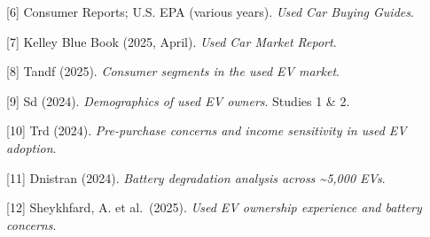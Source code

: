 \documentclass[
  letterpaper,
  DIV=11,
  numbers=noendperiod]{scrartcl}
\begin{document}
{[}6{]} Consumer Reports; U.S. EPA (various years). \emph{Used Car
Buying Guides}.

{[}7{]} Kelley Blue Book (2025, April). \emph{Used Car Market Report}.

{[}8{]} Tandf (2025). \emph{Consumer segments in the used EV market}.

{[}9{]} Sd (2024). \emph{Demographics of used EV owners}. Studies 1 \&
2.

{[}10{]} Trd (2024). \emph{Pre-purchase concerns and income sensitivity
in used EV adoption}.

{[}11{]} Dnistran (2024). \emph{Battery degradation analysis across
\textasciitilde5,000 EVs}.

{[}12{]} Sheykhfard, A. et al.~(2025). \emph{Used EV ownership
experience and battery concerns}.
\end{document}
